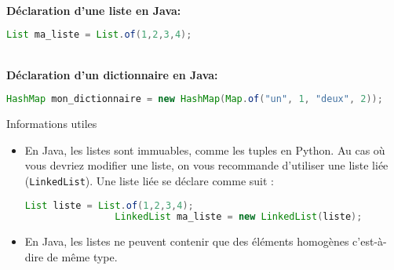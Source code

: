     \textbf{\\ Déclaration d'une liste en Java:}
    
    \begin{lstlisting}[language=Java]
              List ma_liste = List.of(1,2,3,4); \end{lstlisting}
            
    \textbf{\\ Déclaration d'un dictionnaire en Java:} 
    
    \begin{lstlisting}[language=Java]
              HashMap mon_dictionnaire = new HashMap(Map.of("un", 1, "deux", 2)); \end{lstlisting}
              
    
    \begin{Example}{\faTerminal \quad Informations utiles}
        \begin{itemize}
            \item En Java, les listes sont immuables, comme les tuples en Python. Au cas où vous devriez modifier une liste, on vous recommande d'utiliser une liste liée (\lstinline{LinkedList}). Une liste liée se déclare comme suit :
    
            \begin{lstlisting}[language=Java]
                List liste = List.of(1,2,3,4);
                LinkedList ma_liste = new LinkedList(liste); \end{lstlisting}
            \item En Java, les listes ne peuvent contenir que des éléments homogènes c'est-à-dire de même type.
        \end{itemize} 
        
    \end{Example}
	     
